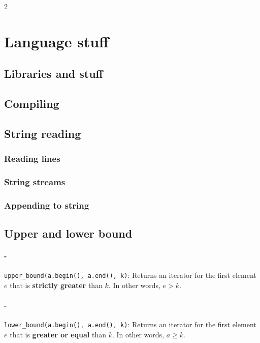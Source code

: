\documentclass[8pt, letterpaper]{article}
\begin{document}
\begin{multicols}{2}
\section{Language stuff}

\subsection{Libraries and stuff}


\subsection{Compiling}


\subsection{String reading}
\subsubsection{Reading lines}


\subsubsection{String streams}


\subsubsection{Appending to string}


\subsection{Upper and lower bound}
\paragraph{-} \verb|upper_bound(a.begin(), a.end(), k)|: Returns an iterator for the first element $e$ that is \textbf{strictly greater} than $k$. In other words, $e > k$.

\paragraph{-} \verb|lower_bound(a.begin(), a.end(), k)|: Returns an iterator for the first element $e$ that is \textbf{greater or equal} than $k$. In other words, $a \geq k$.


\end{multicols}
\end{document}
